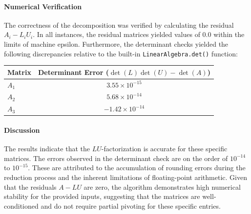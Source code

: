 \begin{solution}
	\paragraph{Numerical Verification}
	The correctness of the decomposition was verified by calculating the residual
	$A_i - L_i U_i$. In all instances, the residual matrices yielded values of $0.0$
	within the limits of machine epsilon. Furthermore, the determinant checks
	yielded the following discrepancies relative to the built-in
	\texttt{LinearAlgebra.det()} function:

	\begin{center}
		\centering
		\renewcommand{\arraystretch}{1.2}
		\begin{tabular}{lc}
			\toprule
			Matrix & Determinant Error ($\det(L) \det(U) - \det(A)$) \\ \midrule
			$A_1$           & $3.55 \times 10^{-15}$                                   \\
			$A_2$           & $5.68 \times 10^{-14}$                                   \\
			$A_3$           & $-1.42 \times 10^{-14}$                                  \\ \bottomrule
		\end{tabular}
	\end{center}

	\paragraph{Discussion}
	The results indicate that the $LU$-factorization is accurate for these
	specific matrices. The errors observed in the determinant check are on the order
	of $10^{-14}$ to $10^{-15}$. These are attributed to the accumulation of
	rounding errors during the reduction process and the inherent limitations of
	floating-point arithmetic. Given that the residuals $A - LU$ are zero, the
	algorithm demonstrates high numerical stability for the provided inputs,
	suggesting that the matrices are well-conditioned and do not require partial
	pivoting for these specific entries.

\end{solution}

